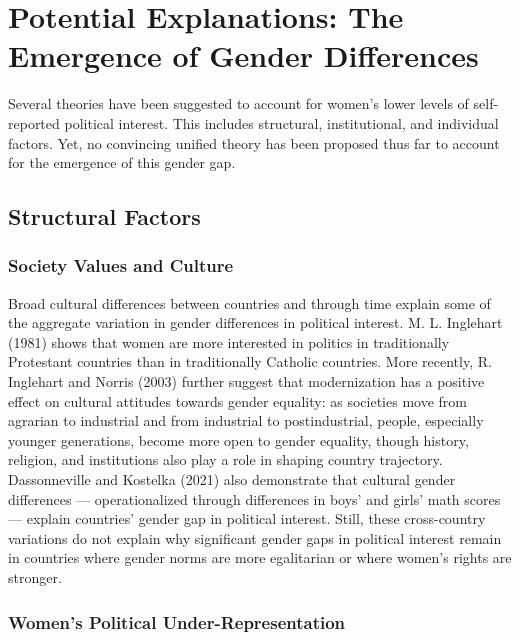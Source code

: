 \documentclass[
  letterpaper,
  DIV=11,
  numbers=noendperiod]{scrreprt}
\begin{document}
\section{Potential Explanations: The Emergence of Gender
Differences}\label{potential-explanations-the-emergence-of-gender-differences}

Several theories have been suggested to account for women's lower levels
of self-reported political interest. This includes structural,
institutional, and individual factors. Yet, no convincing unified theory
has been proposed thus far to account for the emergence of this gender
gap.

\subsection{Structural Factors}\label{structural-factors}

\subsubsection{Society Values and
Culture}\label{society-values-and-culture}

Broad cultural differences between countries and through time explain
some of the aggregate variation in gender differences in political
interest. M. L. Inglehart (1981) shows that women are more interested in
politics in traditionally Protestant countries than in traditionally
Catholic countries. More recently, R. Inglehart and Norris (2003)
further suggest that modernization has a positive effect on cultural
attitudes towards gender equality: as societies move from agrarian to
industrial and from industrial to postindustrial, people, especially
younger generations, become more open to gender equality, though
history, religion, and institutions also play a role in shaping country
trajectory. Dassonneville and Kostelka (2021) also demonstrate that
cultural gender differences --- operationalized through differences in
boys' and girls' math scores --- explain countries' gender gap in
political interest. Still, these cross-country variations do not explain
why significant gender gaps in political interest remain in countries
where gender norms are more egalitarian or where women's rights are
stronger.

\subsubsection{Women's Political
Under-Representation}\label{womens-political-under-representation}
\end{document}
